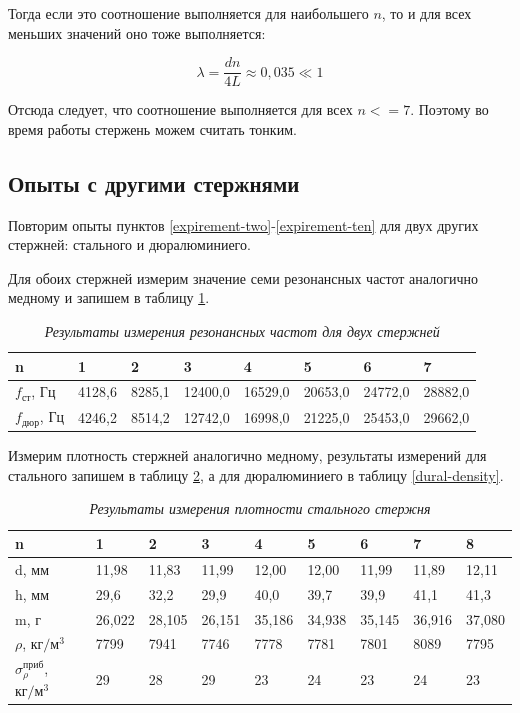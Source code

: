 \documentclass[a4paper,12pt]{article}
\begin{document}
Тогда если это соотношение выполняется для наибольшего $n$, то и для всех меньших значений оно тоже выполняется:

\begin{equation}
    \lambda = \frac{d n}{4 L} \approx 0,035 \ll 1
\end{equation}

Отсюда следует, что соотношение выполняется для всех $n <= 7$. Поэтому во время работы стержень можем считать тонким.

\subsection{Опыты с другими стержнями}

Повторим опыты пунктов \ref{expirement-two}-\ref{expirement-ten} для двух других стержней: стального и дюралюминиего.

Для обоих стержней измерим значение семи резонансных частот аналогично медному и запишем в таблицу \ref{al-fe-resonance}.

\begin{table}[!ht]
    \centering
    \begin{tabular}{|l|l|l|l|l|l|l|l|}
    \hline
        n & 1 & 2 & 3 & 4 & 5 & 6 & 7 \\ \hline
        $f_\text{ст}$, Гц & 4128,6 & 8285,1 & 12400,0 & 16529,0 & 20653,0 & 24772,0 & 28882,0 \\ \hline
        $f_\text{дюр}$, Гц & 4246,2 & 8514,2 & 12742,0 & 16998,0 & 21225,0 & 25453,0 & 29662,0 \\ \hline
    \end{tabular}\caption{\textit{Результаты измерения резонансных частот для двух стержней}}\label{al-fe-resonance}
\end{table}

Измерим плотность стержней аналогично медному, результаты измерений для стального запишем в таблицу \ref{steel-density}, а для дюралюминиего в таблицу \ref{dural-density}.

\begin{table}[!ht]
    \centering
    \begin{tabular}{|l|l|l|l|l|l|l|l|l|}
    \hline
        n & 1 & 2 & 3 & 4 & 5 & 6 & 7 & 8 \\ \hline
        d, мм & 11,98 & 11,83 & 11,99 & 12,00 & 12,00 & 11,99 & 11,89 & 12,11 \\ \hline
        h, мм & 29,6 & 32,2 & 29,9 & 40,0 & 39,7 & 39,9 & 41,1 & 41,3 \\ \hline
        m, г & 26,022 & 28,105 & 26,151 & 35,186 & 34,938 & 35,145 & 36,916 & 37,080 \\ \hline
        $\rho$, $\text{кг}/\text{м}^3$ & 7799 & 7941 & 7746 & 7778 & 7781 & 7801 & 8089 & 7795 \\ \hline
        $\sigma_\rho^\text{приб}$, $\text{кг}/\text{м}^3$ & 29 & 28 & 29 & 23 & 24 & 23 & 24 & 23 \\ \hline
    \end{tabular}\caption{\textit{Результаты измерения плотности стального стержня}}\label{steel-density}
\end{table}
\end{document}
